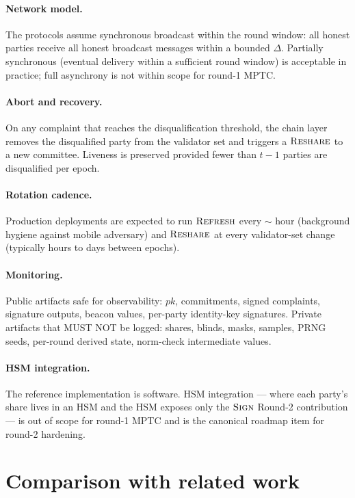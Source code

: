 \documentclass[11pt,a4paper]{article}
\theoremstyle{definition}
\theoremstyle{remark}
\newcommand{\Sign}{\textsc{Sign}}
\newcommand{\Reshare}{\textsc{Reshare}}
\newcommand{\Refresh}{\textsc{Refresh}}
\begin{document}
\paragraph{Network model.}
The protocols assume synchronous broadcast within the round window:
all honest parties receive all honest broadcast messages within a
bounded $\Delta$. Partially synchronous (eventual delivery within a
sufficient round window) is acceptable in practice; full
asynchrony is not within scope for round-1 MPTC.

\paragraph{Abort and recovery.}
On any complaint that reaches the disqualification threshold, the
chain layer removes the disqualified party from the validator set
and triggers a $\Reshare$ to a new committee. Liveness is preserved
provided fewer than $t-1$ parties are disqualified per epoch.

\paragraph{Rotation cadence.}
Production deployments are expected to run $\Refresh$ every
$\sim$ hour (background hygiene against mobile adversary) and
$\Reshare$ at every validator-set change (typically hours to days
between epochs).

\paragraph{Monitoring.}
Public artifacts safe for observability: $\mathit{pk}$, commitments,
signed complaints, signature outputs, beacon values, per-party
identity-key signatures. Private artifacts that MUST NOT be logged:
shares, blinds, masks, samples, PRNG seeds, per-round derived state,
norm-check intermediate values.

\paragraph{HSM integration.}
The reference implementation is software. HSM integration --- where
each party's share lives in an HSM and the HSM exposes only the
$\Sign$ Round-2 contribution --- is out of scope for round-1 MPTC
and is the canonical roadmap item for round-2 hardening.

\section{Comparison with related work}
\label{sec:related}
\end{document}
